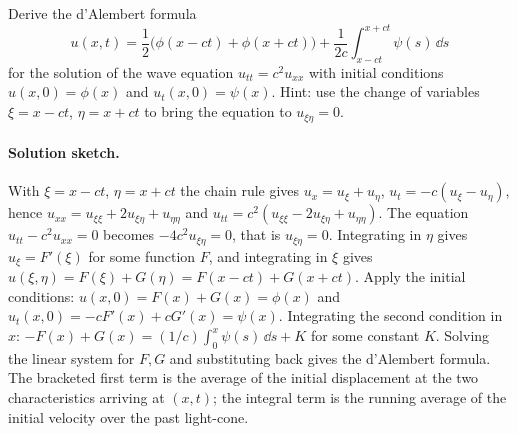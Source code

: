 \begin{exercise}
Derive the d'Alembert formula
\[
u(x, t) = \frac{1}{2}\bigl(\phi(x - c t) + \phi(x + c t)\bigr) + \frac{1}{2 c} \int_{x - c t}^{x + c t} \psi(s)\, \dd s
\]
for the solution of the wave equation $u_{tt} = c^{2} u_{xx}$
with initial conditions $u(x, 0) = \phi(x)$ and $u_{t}(x, 0) =
\psi(x)$. Hint: use the change of variables $\xi = x - c t$,
$\eta = x + c t$ to bring the equation to $u_{\xi \eta} = 0$.

\paragraph{Solution sketch.}
With $\xi = x - ct$, $\eta = x + ct$ the chain rule gives
$u_{x} = u_{\xi} + u_{\eta}$, $u_{t} = -c(u_{\xi} - u_{\eta})$,
hence $u_{xx} = u_{\xi\xi} + 2 u_{\xi\eta} + u_{\eta\eta}$ and
$u_{tt} = c^{2}(u_{\xi\xi} - 2 u_{\xi\eta} + u_{\eta\eta})$. The
equation $u_{tt} - c^{2} u_{xx} = 0$ becomes $-4 c^{2}
u_{\xi\eta} = 0$, that is $u_{\xi\eta} = 0$. Integrating in
$\eta$ gives $u_{\xi} = F'(\xi)$ for some function $F$, and
integrating in $\xi$ gives $u(\xi, \eta) = F(\xi) + G(\eta) =
F(x - ct) + G(x + ct)$. Apply the initial conditions: $u(x, 0)
= F(x) + G(x) = \phi(x)$ and $u_{t}(x, 0) = -c F'(x) + c G'(x) =
\psi(x)$. Integrating the second condition in $x$: $-F(x) + G(x)
= (1/c) \int_{0}^{x} \psi(s)\,\dd s + K$ for some constant $K$.
Solving the linear system for $F, G$ and substituting back gives
the d'Alembert formula. The bracketed first term is the average
of the initial displacement at the two characteristics arriving
at $(x, t)$; the integral term is the running average of the
initial velocity over the past light-cone.
\end{exercise}

